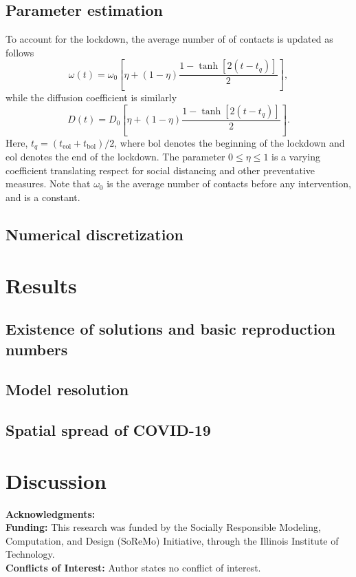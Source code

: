 \documentclass[11pt]{article}
\begin{document}
	\subsection{Parameter estimation}
		To account for the lockdown, the average number of of contacts is updated as follows \cite{Kevrekidis-2021}
		\begin{equation} \label{eq:contacts}
			\omega (t) = \omega_0 \left[ \eta + (1 - \eta) \frac{1 - \tanh \left[2 (t - t_q) \right]}{2} \right],
		\end{equation}
		while the diffusion coefficient is similarly
		\begin{equation} \label{eq:diffusion}
			D (t) = D_0 \left[ \eta + (1 - \eta) \frac{1 - \tanh \left[2 (t - t_q) \right]}{2} \right].
		\end{equation}
		Here, $t_q = (t_{\mathrm{eol}} + t_{\mathrm{bol}}) / 2$, where $\mathrm{bol}$ denotes the beginning of the lockdown and $\mathrm{eol}$ denotes the end of the lockdown.
		The parameter $0 \leq \eta \leq 1$ is a varying coefficient translating respect for social distancing and other preventative measures.
		Note that $\omega_0$ is the average number of contacts before any intervention, and is a constant.
	
	\subsection{Numerical discretization}
\section{Results}
	\subsection{Existence of solutions and basic reproduction numbers}
	
	\subsection{Model resolution}
	
	\subsection{Spatial spread of COVID-19}

\section{Discussion}
	
	\textbf{Acknowledgments:} \\
	\textbf{Funding:}
	This research was funded by the Socially Responsible Modeling, Computation, and Design (SoReMo) Initiative, through the Illinois Institute of Technology. \\
	\textbf{Conflicts of Interest:}
	Author states no conflict of interest. \\



\end{document}
